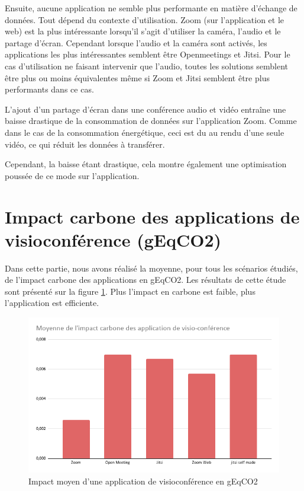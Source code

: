 \documentclass[11pt,a4paper]{report}
\begin{document}
Ensuite, aucune application ne semble plus performante en matière d'échange de données. Tout dépend du contexte d'utilisation. Zoom (sur l'application et le web) est la plus intéressante lorsqu'il s'agit d'utiliser la caméra, l'audio et le partage d'écran. Cependant lorsque l'audio et la caméra sont activés, les applications les plus intéressantes semblent être Openmeetings et Jitsi. Pour le cas d'utilisation ne faisant intervenir que l'audio, toutes les solutions semblent être plus ou moins équivalentes même si Zoom et Jitsi semblent être plus performants dans ce cas.

\br L'ajout d'un partage d'écran dans une conférence audio et vidéo entraîne une baisse drastique de la consommation de données sur l'application Zoom. Comme dans le cas de la consommation énergétique, ceci est du au rendu d'une seule vidéo, ce qui réduit les données à transférer. 

\noindent Cependant, la baisse étant drastique, cela montre également une optimisation poussée de ce mode sur l'application. \eb 

\section{Impact carbone des applications de visioconférence (gEqCO2)}

Dans cette partie, nous avons réalisé la moyenne, pour tous les scénarios étudiés, de l'impact carbone  des applications en gEqCO2. Les résultats de cette étude sont présenté sur la figure \ref{fig:my_label}. Plus l'impact en carbone est faible, plus l'application est efficiente.

\begin{figure}[!h]
    \centering
    \includegraphics[scale=0.5]{moyenne.png}
    \caption{Impact moyen d'une application de visioconférence en gEqCO2}
    \label{fig:my_label}
\end{figure}
\end{document}
